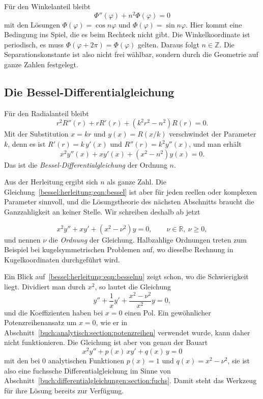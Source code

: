 Für den Winkelanteil bleibt
\begin{equation}
\Phi''(\varphi) + n^2\Phi(\varphi) = 0
\label{bessel:herleitung:eqn:winkel}
\end{equation}
mit den Lösungen $\Phi(\varphi)=\cos n\varphi$ und $\Phi(\varphi)=\sin n\varphi$.
Hier kommt eine Bedingung ins Spiel, die es beim Rechteck nicht gibt.
Die Winkelkoordinate ist periodisch, es muss $\Phi(\varphi+2\pi)=\Phi(\varphi)$ gelten.
Daraus folgt $n\in\mathbb{Z}$.
Die Separationskonstante ist also nicht frei wählbar, sondern durch die Geometrie auf ganze Zahlen festgelegt.
 
%
%
\subsection{Die Bessel-Differentialgleichung
\label{bessel:herleitung:subsection:besseldgl}}
Für den Radialanteil bleibt
\begin{equation}
r^2R''(r) + rR'(r) + (k^2r^2-n^2)R(r) = 0.
\label{bessel:herleitung:eqn:radial}
\end{equation}
Mit der Substitution $x=kr$ und $y(x)=R(x/k)$ verschwindet der
Parameter $k$, denn es ist
$R'(r)=k\,y'(x)$ und $R''(r)=k^2y''(x)$, und man erhält
\begin{equation}
x^2y''(x) + xy'(x) + (x^2-n^2)y(x) = 0.
\label{bessel:herleitung:eqn:bessel}
\end{equation}
Das ist die \emph{Bessel-Differentialgleichung}
%
der Ordnung $n$.
 
Aus der Herleitung ergibt sich $n$ als ganze Zahl.
Die Gleichung~\eqref{bessel:herleitung:eqn:bessel} ist aber für jeden reellen oder komplexen Parameter sinnvoll, und die Lösungstheorie des nächsten Abschnitts braucht die Ganzzahligkeit an keiner Stelle.
Wir schreiben deshalb ab jetzt

\begin{equation}
x^2y'' + xy' + (x^2-\nu^2)y = 0,
\qquad
\nu \in \mathbb{R},\ \nu \ge 0,
\label{bessel:herleitung:eqn:besselnu}
\end{equation}
und nennen $\nu$ die \emph{Ordnung}
%
der Gleichung.
Halbzahlige Ordnungen treten zum Beispiel bei kugelsymmetrischen Problemen auf, wo dieselbe Rechnung in Kugelkoordinaten durchgeführt wird.
 
Ein Blick auf~\eqref{bessel:herleitung:eqn:besselnu} zeigt schon, wo die Schwierigkeit liegt.
Dividiert man durch $x^2$, so lautet die Gleichung
\[
y''
+
\frac{1}{x}y'
+
\frac{x^2-\nu^2}{x^2}y
=
0,
\]
und die Koeffizienten haben bei $x=0$ einen Pol.
Ein gewöhnlicher Potenzreihenansatz um $x=0$, wie er in Abschnitt~\ref{buch:analytisch:section:potenzreihen} verwendet wurde, kann daher nicht funktionieren.
Die Gleichung ist aber von genau der Bauart
\[
x^2y'' + p(x)\,xy' + q(x)\,y = 0
\]
mit den bei $0$ analytischen Funktionen $p(x)=1$ und $q(x)=x^2-\nu^2$, sie ist also eine fuchssche Differentialgleichung im Sinne von Abschnitt~\ref{buch:differentialgleichungen:section:fuchs}.
Damit steht das Werkzeug für ihre Lösung bereits zur Verfügung.